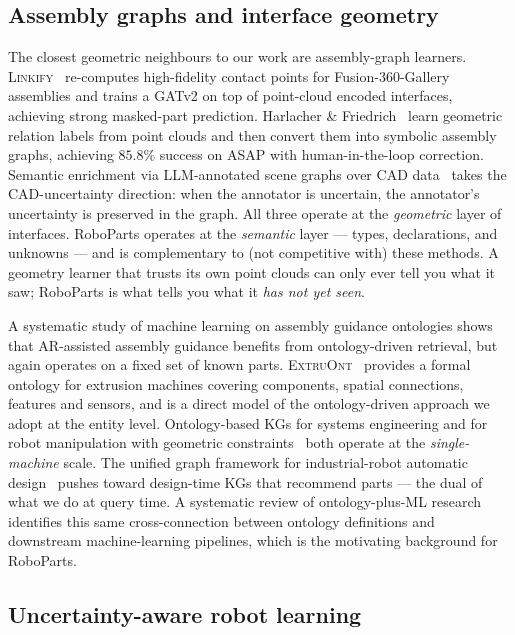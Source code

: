 \documentclass[review]{elsarticle}
\begin{document}
\subsection{Assembly graphs and interface geometry}

The closest geometric neighbours to our work are assembly-graph
learners. \textsc{Linkify}~\cite{R1} re-computes high-fidelity
contact points for Fusion-360-Gallery assemblies and trains a GATv2
on top of point-cloud encoded interfaces, achieving strong masked-part
prediction. Harlacher \& Friedrich~\cite{R2} learn geometric relation
labels from point clouds and then convert them into symbolic assembly
graphs, achieving $85.8\%$ success on \textsc{ASAP} with human-in-the-loop
correction. Semantic enrichment via LLM-annotated scene graphs over
CAD data~\cite{R3} takes the CAD-uncertainty direction: when the
annotator is uncertain, the annotator's uncertainty is preserved in
the graph. All three operate at the \emph{geometric} layer of
interfaces. RoboParts operates at the \emph{semantic} layer — types,
declarations, and unknowns — and is complementary to (not
competitive with) these methods. A geometry learner that trusts its
own point clouds can only ever tell you what it saw; RoboParts is
what tells you what it \emph{has not yet seen}.

A systematic study of machine learning on assembly guidance ontologies
\cite{R8} shows that AR-assisted assembly guidance benefits from
ontology-driven retrieval, but again operates on a fixed set of known
parts. \textsc{ExtruOnt}~\cite{R5} provides a formal ontology for
extrusion machines covering components, spatial connections, features
and sensors, and is a direct model of the ontology-driven approach we
adopt at the entity level. Ontology-based KGs for systems engineering
\cite{R6} and for robot manipulation with geometric constraints~\cite{R7}
both operate at the \emph{single-machine} scale. The unified graph
framework for industrial-robot automatic design~\cite{R4} pushes
toward design-time KGs that recommend parts — the dual of what we do
at query time. A systematic review of ontology-plus-ML research
\cite{R9} identifies this same cross-connection between ontology
definitions and downstream machine-learning pipelines, which is the
motivating background for RoboParts.

\subsection{Uncertainty-aware robot learning}
\end{document}
